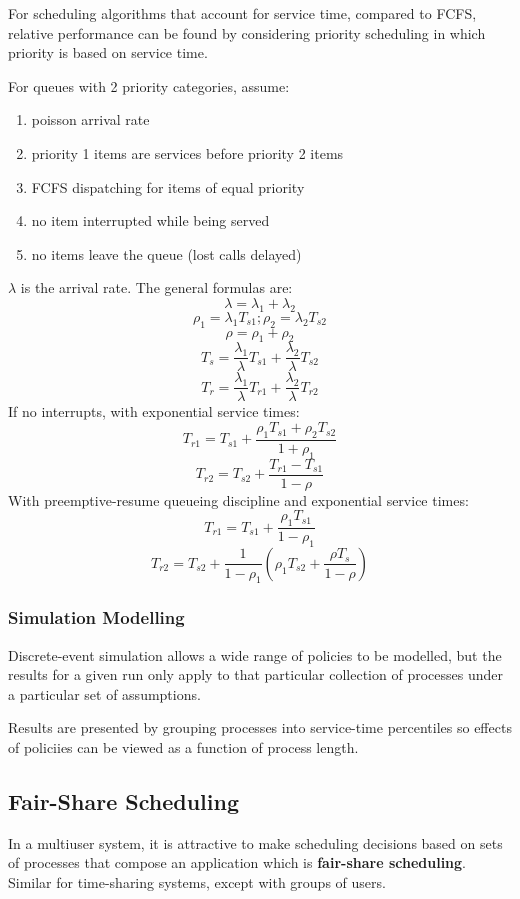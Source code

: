 \documentclass[11pt]{article}
\begin{document}
For scheduling algorithms that account for service time, compared to FCFS, relative
performance can be found by considering priority scheduling in which priority is
based on service time.

For queues with 2 priority categories, assume:
\begin{enumerate}
\item poisson arrival rate
\item priority 1 items are services before priority 2 items
\item FCFS dispatching for items of equal priority
\item no item interrupted while being served
\item no items leave the queue (lost calls delayed)
\end{enumerate}
\(\lambda\) is the arrival rate.
The general formulas are:
$$
\lambda = \lambda_{1} + \lambda_{2}
$$
$$
\rho_{1} = \lambda_{1} T_{s1} ; \rho_{2} = \lambda_{2} T_{s2}
$$
$$
\rho = \rho_{1} + \rho_{2}
$$
$$
T_{s} = \frac{\lambda_{1}}{\lambda} T_{s1} + \frac{\lambda_{2}}{\lambda}T_{s2}
$$
$$
T_{r} = \frac{\lambda_{1}}{\lambda} T_{r1} + \frac{\lambda_{2}}{\lambda}T_{r2}
$$
If no interrupts, with exponential service times:
$$
T_{r1} = T_{s1} + \frac{\rho_{1}T_{s1} + \rho_{2}T_{s2}}{1 + \rho_{1}}
$$
$$
T_{r2} = T_{s2} + \frac{T_{r1} - T_{s1}}{1 - \rho}
$$
With preemptive-resume queueing discipline and exponential service times:
$$
T_{r1} = T_{s1} + \frac{\rho_{1}T_{s1}}{1 - \rho_{1}}
$$
$$
T_{r2} = T_{s2} + \frac{1}{1 - \rho_{1}} \left(
\rho_{1} T_{s2} + \frac{\rho T_{s}}{1 - \rho}
\right)
$$
\subsubsection{Simulation Modelling}
\label{sec:orgcd32060}
Discrete-event simulation allows a wide range of policies to be modelled, but the results
for a given run only apply to that particular collection of processes under a particular
set of assumptions.

Results are presented by grouping processes into service-time percentiles so effects
of policiies can be viewed as a function of process length.
\subsection{Fair-Share Scheduling}
\label{sec:orgbcfe6af}
In a multiuser system, it is attractive to make scheduling decisions based on sets of processes
that compose an application which is \textbf{fair-share scheduling}.
Similar for time-sharing systems, except with groups of users.
\end{document}

